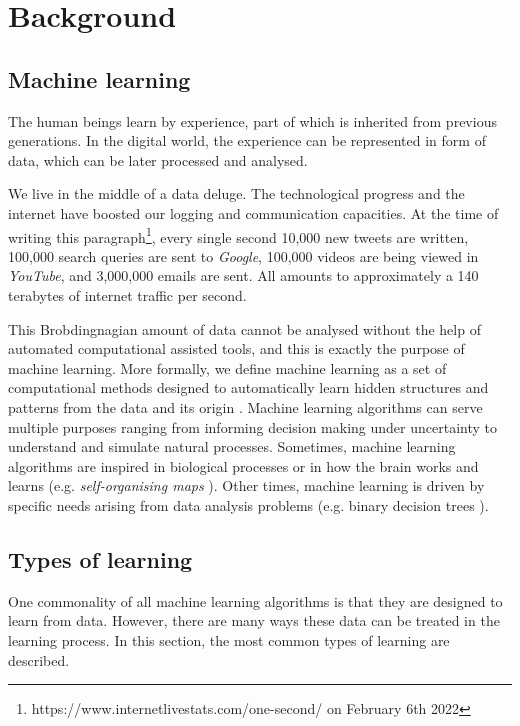 \chapter{Background} \label{ch:background}
\section{Machine learning}
The human beings learn by experience, part of which is inherited from previous generations. In the digital world, the experience can be represented in form of data, which can be later processed and analysed.

We live in the middle of a data deluge. The technological progress and the internet have boosted our logging and communication capacities. At the time of writing this paragraph\footnote{https://www.internetlivestats.com/one-second/ on February 6th 2022}, every single second 10,000 new tweets are written, 100,000 search queries are sent to \textit{Google}, 100,000 videos are being viewed in \textit{YouTube}, and 3,000,000 emails are sent. All amounts to approximately a 140 terabytes of internet traffic per second.

This Brobdingnagian amount of data cannot be analysed without the help of automated computational assisted tools, and this is exactly the purpose of machine learning. More formally, we define machine learning as a set of computational methods designed to automatically learn hidden structures and patterns from the data and its origin \autocite{murphy2012, theodoridis2015}. Machine learning algorithms can serve multiple purposes ranging from informing decision making under uncertainty to understand and simulate natural processes. Sometimes, machine learning algorithms are inspired in biological processes or in how the brain works and learns \autocite{haykin1998} (e.g. \textit{self-organising maps} \autocite{kohonen2001}). Other times, machine learning is driven by specific needs arising from data analysis problems (e.g. binary decision trees \autocite{hastie2009, hastie2014}).

\section{Types of learning}
One commonality of all machine learning algorithms is that they are designed to learn from data. However, there are many ways these data can be treated in the learning process. In this section, the most common types of learning are described.


